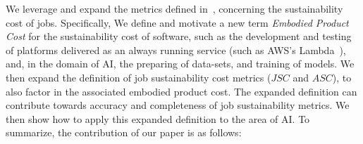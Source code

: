 We leverage and expand the metrics defined in~\cite{gandhi2022metrics}, concerning the sustainability cost of jobs. Specifically, 
We define and motivate a new term {\em Embodied Product Cost} for 
the sustainability cost of software, 
such as the development and testing of platforms delivered as 
an always running service (such as AWS's Lambda~\cite{lambda}), and, in the domain of AI, the preparing of data-sets, and training of models. We then expand the definition of job sustainability cost metrics ($JSC$ and $ASC$), to also 
factor in the associated embodied product cost. The expanded definition can contribute towards accuracy and completeness of job sustainability metrics.
We then show how to 
apply this expanded definition to the area of AI.  
To summarize, 
the contribution of our paper is as follows: 
